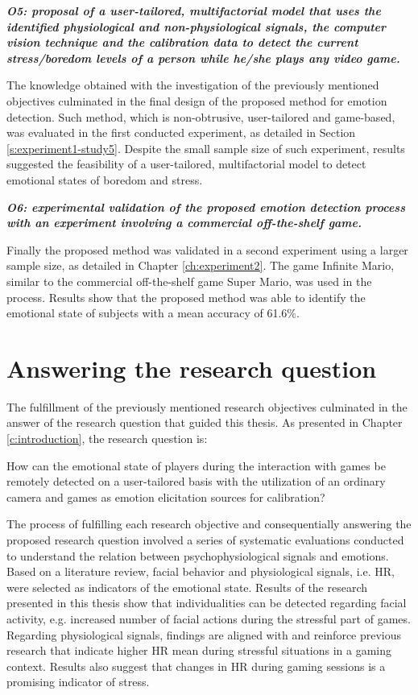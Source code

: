\textit{\textbf{O5: proposal of a user-tailored, multifactorial model that uses the identified physiological and non-physiological signals, the computer vision technique and the calibration data to detect the current stress/boredom levels of a person while he/she plays any video game.}}

The knowledge obtained with the investigation of the previously mentioned objectives culminated in the final design of the proposed method for emotion detection. Such method, which is non-obtrusive, user-tailored and game-based, was evaluated in the first conducted experiment, as detailed in Section \ref{s:experiment1-study5}. Despite the small sample size of such experiment, results suggested the feasibility of a user-tailored, multifactorial model to detect emotional states of boredom and stress.

\textit{\textbf{O6: experimental validation of the proposed emotion detection process with an experiment involving a commercial off-the-shelf game.}}

Finally the proposed method was validated in a second experiment using a larger sample size, as detailed in Chapter \ref{ch:experiment2}. The game Infinite Mario, similar to the commercial off-the-shelf game Super Mario, was used in the process. Results show that the proposed method was able to identify the emotional state of subjects with a mean accuracy of 61.6\%.

\section{Answering the research question}

The fulfillment of the previously mentioned research objectives culminated in the answer of the research question that guided this thesis. As presented in Chapter \ref{c:introduction}, the research question is:

\begin{fquote}
How can the emotional state of players during the interaction with games be remotely detected on a user-tailored basis with the utilization of an ordinary camera and games as emotion elicitation sources for calibration?
\end{fquote}

The process of fulfilling each research objective and consequentially answering the proposed research question involved a series of systematic evaluations conducted to understand the relation between psychophysiological signals and emotions. Based on a literature review, facial behavior and physiological signals, i.e. HR, were selected as indicators of the emotional state. Results of the research presented in this thesis show that individualities can be detected regarding facial activity, e.g. increased number of facial actions during the stressful part of games. Regarding physiological signals, findings are aligned with and reinforce previous research that indicate higher HR mean during stressful situations in a gaming context. Results also suggest that changes in HR during gaming sessions is a promising indicator of stress.

